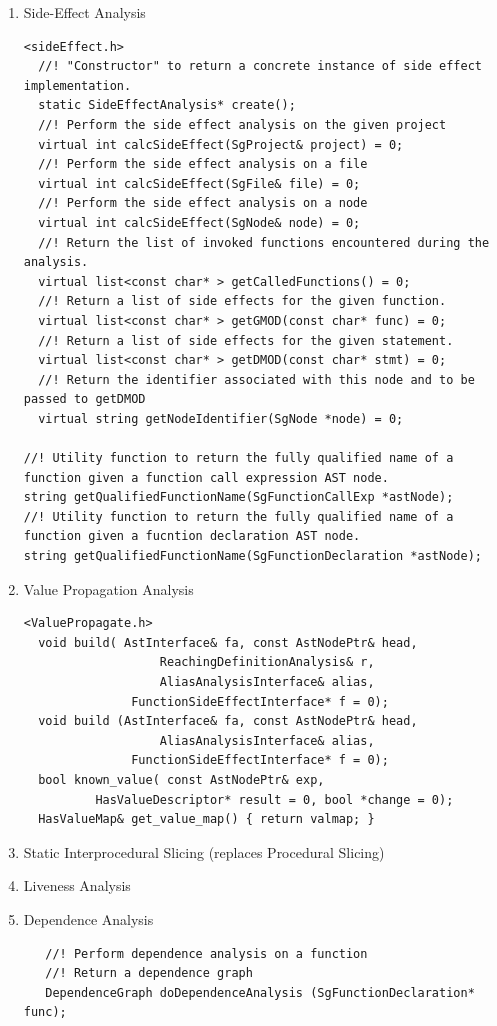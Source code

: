 \begin{enumerate}
\begin{enumerate}
      \item Side-Effect Analysis
      \begin{lstlisting}
<sideEffect.h>
  //! "Constructor" to return a concrete instance of side effect implementation.
  static SideEffectAnalysis* create();
  //! Perform the side effect analysis on the given project
  virtual int calcSideEffect(SgProject& project) = 0;
  //! Perform the side effect analysis on a file
  virtual int calcSideEffect(SgFile& file) = 0;
  //! Perform the side effect analysis on a node
  virtual int calcSideEffect(SgNode& node) = 0;
  //! Return the list of invoked functions encountered during the analysis.
  virtual list<const char* > getCalledFunctions() = 0;
  //! Return a list of side effects for the given function.
  virtual list<const char* > getGMOD(const char* func) = 0;
  //! Return a list of side effects for the given statement.
  virtual list<const char* > getDMOD(const char* stmt) = 0;
  //! Return the identifier associated with this node and to be passed to getDMOD
  virtual string getNodeIdentifier(SgNode *node) = 0;

//! Utility function to return the fully qualified name of a function given a function call expression AST node.
string getQualifiedFunctionName(SgFunctionCallExp *astNode);
//! Utility function to return the fully qualified name of a function given a fucntion declaration AST node.
string getQualifiedFunctionName(SgFunctionDeclaration *astNode);
      \end{lstlisting}

      \item Value Propagation Analysis
      \begin{lstlisting}
<ValuePropagate.h>
  void build( AstInterface& fa, const AstNodePtr& head,
                   ReachingDefinitionAnalysis& r, 
                   AliasAnalysisInterface& alias,
	           FunctionSideEffectInterface* f = 0);
  void build (AstInterface& fa, const AstNodePtr& head, 
                   AliasAnalysisInterface& alias,
	           FunctionSideEffectInterface* f = 0);
  bool known_value( const AstNodePtr& exp, 
 		  HasValueDescriptor* result = 0, bool *change = 0);
  HasValueMap& get_value_map() { return valmap; }

      \end{lstlisting}



      \item Static Interprocedural Slicing (replaces Procedural Slicing)
      \item Liveness Analysis
      \item Dependence Analysis
   \begin{lstlisting}
   //! Perform dependence analysis on a function
   //! Return a dependence graph
   DependenceGraph doDependenceAnalysis (SgFunctionDeclaration* func);


\end{lstlisting}
\end{enumerate}
\end{enumerate}
